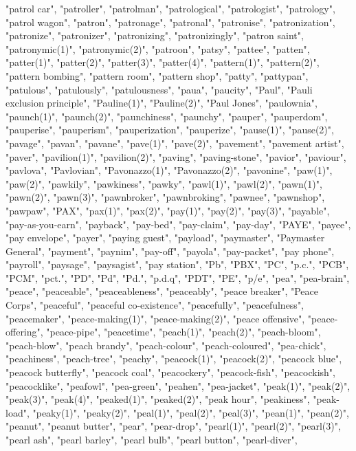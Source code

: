 "patrol car",
"patroller",
"patrolman",
"patrological",
"patrologist",
"patrology",
"patrol wagon",
"patron",
"patronage",
"patronal",
"patronise",
"patronization",
"patronize",
"patronizer",
"patronizing",
"patronizingly",
"patron saint",
"patronymic(1)",
"patronymic(2)",
"patroon",
"patsy",
"pattee",
"patten",
"patter(1)",
"patter(2)",
"patter(3)",
"patter(4)",
"pattern(1)",
"pattern(2)",
"pattern bombing",
"pattern room",
"pattern shop",
"patty",
"pattypan",
"patulous",
"patulously",
"patulousness",
"paua",
"paucity",
"Paul",
"Pauli exclusion principle",
"Pauline(1)",
"Pauline(2)",
"Paul Jones",
"paulownia",
"paunch(1)",
"paunch(2)",
"paunchiness",
"paunchy",
"pauper",
"pauperdom",
"pauperise",
"pauperism",
"pauperization",
"pauperize",
"pause(1)",
"pause(2)",
"pavage",
"pavan",
"pavane",
"pave(1)",
"pave(2)",
"pavement",
"pavement artist",
"paver",
"pavilion(1)",
"pavilion(2)",
"paving",
"paving-stone",
"pavior",
"paviour",
"pavlova",
"Pavlovian",
"Pavonazzo(1)",
"Pavonazzo(2)",
"pavonine",
"paw(1)",
"paw(2)",
"pawkily",
"pawkiness",
"pawky",
"pawl(1)",
"pawl(2)",
"pawn(1)",
"pawn(2)",
"pawn(3)",
"pawnbroker",
"pawnbroking",
"pawnee",
"pawnshop",
"pawpaw",
"PAX",
"pax(1)",
"pax(2)",
"pay(1)",
"pay(2)",
"pay(3)",
"payable",
"pay-as-you-earn",
"payback",
"pay-bed",
"pay-claim",
"pay-day",
"PAYE",
"payee",
"pay envelope",
"payer",
"paying guest",
"payload",
"paymaster",
"Paymaster General",
"payment",
"paynim",
"pay-off",
"payola",
"pay-packet",
"pay phone",
"payroll",
"paysage",
"paysagist",
"pay station",
"Pb",
"PBX",
"PC",
"p.c.",
"PCB",
"PCM",
"pct.",
"PD",
"Pd",
"Pd.",
"p.d.q",
"PDT",
"PE",
"p/e",
"pea",
"pea-brain",
"peace",
"peaceable",
"peaceableness",
"peaceably",
"peace breaker",
"Peace Corps",
"peaceful",
"peaceful co-existence",
"peacefully",
"peacefulness",
"peacemaker",
"peace-making(1)",
"peace-making(2)",
"peace offensive",
"peace-offering",
"peace-pipe",
"peacetime",
"peach(1)",
"peach(2)",
"peach-bloom",
"peach-blow",
"peach brandy",
"peach-colour",
"peach-coloured",
"pea-chick",
"peachiness",
"peach-tree",
"peachy",
"peacock(1)",
"peacock(2)",
"peacock blue",
"peacock butterfly",
"peacock coal",
"peacockery",
"peacock-fish",
"peacockish",
"peacocklike",
"peafowl",
"pea-green",
"peahen",
"pea-jacket",
"peak(1)",
"peak(2)",
"peak(3)",
"peak(4)",
"peaked(1)",
"peaked(2)",
"peak hour",
"peakiness",
"peak-load",
"peaky(1)",
"peaky(2)",
"peal(1)",
"peal(2)",
"peal(3)",
"pean(1)",
"pean(2)",
"peanut",
"peanut butter",
"pear",
"pear-drop",
"pearl(1)",
"pearl(2)",
"pearl(3)",
"pearl ash",
"pearl barley",
"pearl bulb",
"pearl button",
"pearl-diver",
